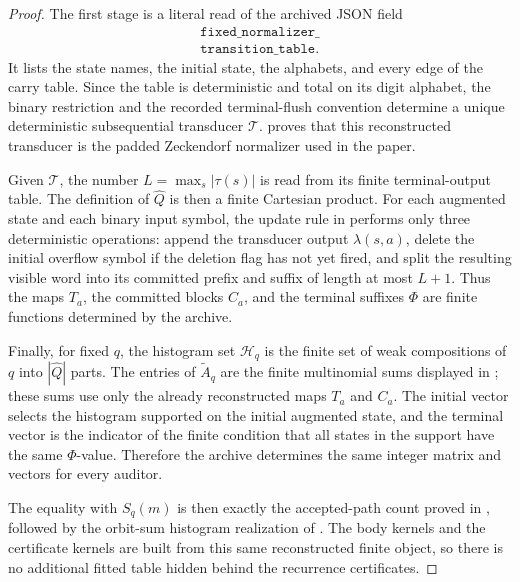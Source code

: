 \begin{proof}
The first stage is a literal read of the archived JSON field
\[
\begin{gathered}
\texttt{fixed\_normalizer\_}\\
\texttt{transition\_table}.
\end{gathered}
\]
It lists the state names, the initial state, the alphabets, and every edge of
the carry table.  Since the table is deterministic and total on its digit
alphabet, the binary restriction and the recorded terminal-flush convention
determine a unique deterministic subsequential transducer \(\mathcal T\).
 proves that this reconstructed
transducer is the padded Zeckendorf normalizer used in the paper.

Given \(\mathcal T\), the number \(L=\max_s|\tau(s)|\) is read from its finite
terminal-output table.  The definition of \(\widehat Q\) is then a finite
Cartesian product.  For each augmented state and each binary input symbol, the
update rule in  performs only three
deterministic operations: append the transducer output \(\lambda(s,a)\), delete
the initial overflow symbol if the deletion flag has not yet fired, and split
the resulting visible word into its committed prefix and suffix of length at
most \(L+1\).  Thus the maps \(T_a\), the committed blocks \(C_a\), and the
terminal suffixes \(\Phi\) are finite functions determined by the archive.

Finally, for fixed \(q\), the histogram set \(\mathcal H_q\) is the finite set
of weak compositions of \(q\) into \(|\widehat Q|\) parts.  The entries of
\(\widetilde A_q\) are the finite multinomial sums displayed in
; these sums use only the already
reconstructed maps \(T_a\) and \(C_a\).  The initial vector selects the
histogram supported on the initial augmented state, and the terminal vector is
the indicator of the finite condition that all states in the support have the
same \(\Phi\)-value.  Therefore the archive determines the same integer matrix
and vectors for every auditor.

The equality with \(S_q(m)\) is then exactly the accepted-path count proved in
, followed by the orbit-sum histogram
realization of .  The body kernels and
the certificate kernels are built from this same reconstructed finite object,
so there is no additional fitted table hidden behind the recurrence
certificates.
\end{proof}

